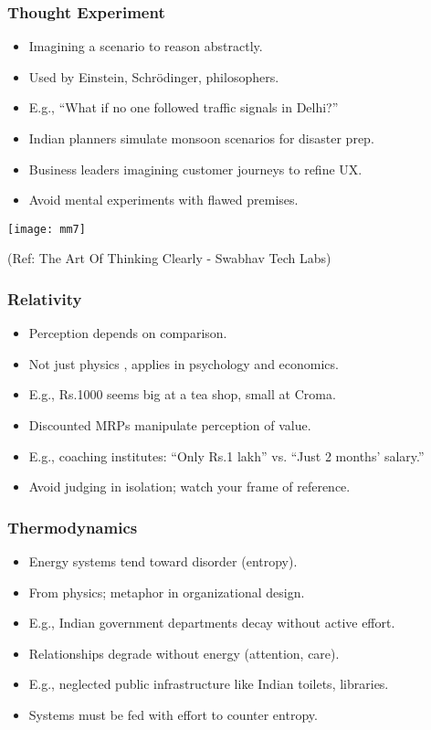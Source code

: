 \begin{frame}[fragile]\frametitle{Thought Experiment}
  \begin{itemize}
    \item Imagining a scenario to reason abstractly.
    \item Used by Einstein, Schrödinger, philosophers.
    \item E.g., ``What if no one followed traffic signals in Delhi?''
    \item Indian planners simulate monsoon scenarios for disaster prep.
    \item Business leaders imagining customer journeys to refine UX.
    \item Avoid mental experiments with flawed premises.
  \end{itemize}
  
	\begin{center}
	\texttt{[image: mm7]}
	\end{center}
	
{\tiny (Ref: The Art Of Thinking Clearly - Swabhav Tech Labs)}      
\end{frame}

\begin{frame}[fragile]\frametitle{Relativity}
  \begin{itemize}
    \item Perception depends on comparison.
    \item Not just physics , applies in psychology and economics.
    \item E.g., Rs.1000 seems big at a tea shop, small at Croma.
    \item Discounted MRPs manipulate perception of value.
    \item E.g., coaching institutes: ``Only Rs.1 lakh'' vs. ``Just 2 months' salary.''
    \item Avoid judging in isolation; watch your frame of reference.
  \end{itemize}
\end{frame}

\begin{frame}[fragile]\frametitle{Thermodynamics}
  \begin{itemize}
    \item Energy systems tend toward disorder (entropy).
    \item From physics; metaphor in organizational design.
    \item E.g., Indian government departments decay without active effort.
    \item Relationships degrade without energy (attention, care).
    \item E.g., neglected public infrastructure like Indian toilets, libraries.
    \item Systems must be fed with effort to counter entropy.
  \end{itemize}
\end{frame}

